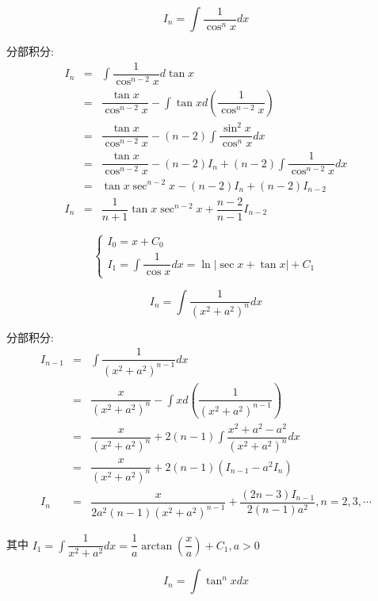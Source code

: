 \begin{theorem}[递归积分]
	\begin{proposition}
		$$I_{n} = \int \dfrac{1}{\cos^{n} x}dx$$ 
	\end{proposition}
	\begin{solution}

		分部积分: 
		\begin{eqnarray*}
			I_{n} & = & \int \dfrac{1}{\cos^{n-2} x}d\tan x\\
			      & = & \dfrac{\tan x}{\cos^{n-2} x} - \int \tan xd(\dfrac{1}{\cos^{n-2}x})\\
				  & = & \dfrac{\tan x}{\cos^{n-2} x} - (n-2)\int \dfrac{\sin^{2} x}{\cos^{n} x}dx \\
				  & = & \dfrac{\tan x}{\cos^{n-2} x} - (n-2)I_{n} + (n-2)\int \dfrac{1}{\cos^{n-2} x}dx\\
			      & = & \tan x\sec^{n-2}x - (n-2)I_{n} + (n-2)I_{n-2}\\
			I_{n} & = & \dfrac{1}{n+1}\tan x\sec^{n-2}x + \dfrac{n-2}{n-1}I_{n-2}
		\end{eqnarray*}

		 
		$$\begin{cases} 
			I_{0} = x + C_{0} \\ 
			I_{1} = \int \dfrac{1}{\cos x}dx = \ln |\sec x+\tan x| + C_{1} 
		\end{cases}$$
	\end{solution}
	\begin{proposition}\label{pro: 递归积分}
		$$I_{n} = \int \dfrac{1}{(x^{2}+a^{2})^{n}}dx$$ 
	\end{proposition}
	\begin{solution}

		分部积分:
		\begin{eqnarray*}
			I_{n-1} & = & \int \dfrac{1}{(x^{2}+a^{2})^{n-1}}dx\\
			        & = & \dfrac{x}{(x^{2}+a^{2})^{n}} - \int xd(\dfrac{1}{(x^{2}+a^{2})^{n-1}})\\
				    & = & \dfrac{x}{(x^{2}+a^{2})^{n}} + 2(n-1)\int \dfrac{x^{2}+a^{2}-a^{2}}{(x^{2}+a^{2})^{n}}dx\\
				    & = & \dfrac{x}{(x^{2}+a^{2})^{n}} + 2(n-1)(I_{n-1}-a^{2}I_{n})\\
			I_{n}   & = & \dfrac{x}{2a^{2}(n-1)(x^{2}+a^{2})^{n-1}} + \dfrac{(2n-3)I_{n-1}}{2(n-1)a^{2}}, n = 2,3,\cdots 
		\end{eqnarray*}

		其中 $I_{1} =\int \dfrac{1}{x^{2}+a^{2}}dx = \dfrac{1}{a}\arctan (\dfrac{x}{a}) +C_{1}, a>0$
	\end{solution}
	\begin{proposition}
		$$I_{n} = \int \tan^{n} xdx$$ 
	\end{proposition}
	\begin{solution}


\end{solution}
\end{theorem}
